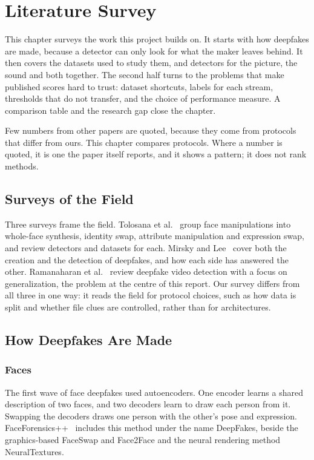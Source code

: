%
\chapter{Literature Survey}
\label{ch:literature}

This chapter surveys the work this project builds on. It starts with how
deepfakes are made, because a detector can only look for what the maker
leaves behind. It then covers the datasets used to study them, and detectors
for the picture, the sound and both together. The second half turns to the
problems that make published scores hard to trust: dataset shortcuts, labels
for each stream, thresholds that do not transfer, and the choice of
performance measure. A comparison table and the research gap close the
chapter.

Few numbers from other papers are quoted, because they come from protocols
that differ from ours. This chapter compares protocols. Where a number is
quoted, it is one the paper itself reports, and it shows a pattern; it does
not rank methods.

\section{Surveys of the Field}

Three surveys frame the field. Tolosana et al.~\cite{tolosana} group face
manipulations into whole-face synthesis, identity swap, attribute
manipulation and expression swap, and review detectors and datasets for each.
Mirsky and Lee~\cite{mirsky} cover both the creation and the detection of
deepfakes, and how each side has answered the other. Ramanaharan et
al.~\cite{ramanaharan2025} review deepfake video detection with a focus on
generalization, the problem at the centre of this report. Our survey differs
from all three in one way: it reads the field for protocol choices, such as
how data is split and whether file clues are controlled, rather than for
architectures.

\section{How Deepfakes Are Made}
\label{sec:l-generation}

\subsection{Faces}

The first wave of face deepfakes used autoencoders. One encoder learns a
shared description of two faces, and two decoders learn to draw each person
from it. Swapping the decoders draws one person with the other's pose and
expression. FaceForensics++~\cite{ffpp} includes this method under the name
DeepFakes, beside the graphics-based FaceSwap and Face2Face and the neural
rendering method NeuralTextures.

